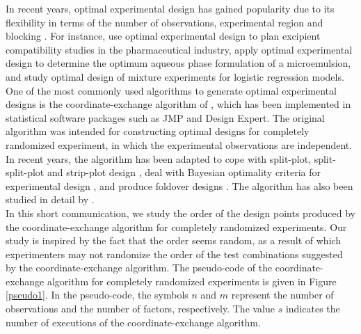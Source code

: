 




In recent years, optimal experimental design has gained popularity due to its flexibility in terms of the number of observations, experimental region and blocking \citep{goos}. For instance, \cite{akkermans} use optimal experimental design to plan excipient compatibility studies in the pharmaceutical industry, \cite{jeirani} apply optimal experimental design to determine the optimum aqueous phase formulation of a microemulsion, and \cite{mancenido} study optimal design of mixture experiments for logistic regression models.\\

One of the most commonly used algorithms to generate optimal experimental designs is the coordinate-exchange algorithm of \cite{meyer}, which has been implemented in statistical software packages such as JMP and Design Expert. The original algorithm was intended for constructing optimal designs for completely randomized experiment, in which the experimental observations are independent. In recent years, the algorithm has been adapted to cope with split-plot, split-split-plot and strip-plot design \citep{jones2,jones,arnouts,arnouts2,trinca}, deal with Bayesian optimality criteria for experimental design \citep{kessels,mylona}, and produce foldover designs \citep{errore}. The algorithm has also been studied in detail by \citet{cuervo}.\\

In this short communication, we study the order of the design points produced by the coor\-di\-nate-exchange algorithm for completely randomized experiments. Our study is inspired by the fact that the order seems random, as a result of which experimenters may not randomize the order of the test combinations suggested by the coordinate-exchange algorithm. The pseudo-code of the coordinate-exchange algorithm for completely randomized experiments is given in Figure \ref{pseudo1}. In the pseudo-code, the symbols $n$ and $m$ represent the number of observations and the number of factors, respectively. The value $s$ indicates the number of executions of the coordinate-exchange algorithm.\\

